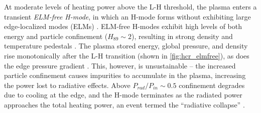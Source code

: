 \begin{figure}[t]
 \pushtooutside
\end{figure}

At moderate levels of heating power above the L-H threshold, the plasma enters a transient \emph{ELM-free H-mode}, in which an H-mode forms without exhibiting large edge-localized modes (ELMs) \cite{Zohm1996,Suttrop2000a}.  ELM-free H-modes exhibit high levels of both energy and particle confinement ($H_{89} \sim 2$), resulting in strong density and temperature pedestals \cite{Hubbard2000,Hatae1998}.  The plasma stored energy, global pressure, and density rise monotonically after the L-H transition (shown in \cref{fig:hcr_elmfree}), as does the edge pressure gradient \cite{Breger1998}.  This, however, is unsustainable -- the increased particle confinement causes impurities to accumulate in the plasma, increasing the power lost to radiative effects.  Above $P_{rad}/P_{in} \sim 0.5$ confinement degrades due to cooling at the edge, and the H-mode terminates as the radiated power approaches the total heating power, an event termed the ``radiative collapse'' \cite{Greenwald1997}.

